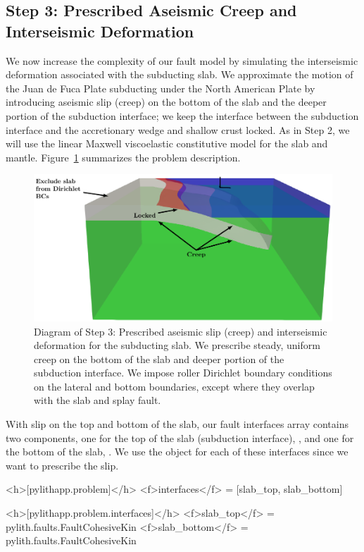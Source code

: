 \subsection{Step 3: Prescribed Aseismic Creep and Interseismic Deformation}
\label{sec:example:subduction:3d:step03}

We now increase the complexity of our fault model by simulating the
interseismic deformation associated with the subducting slab. We
approximate the motion of the Juan de Fuca Plate subducting under the
North American Plate by introducing aseismic slip (creep) on the
bottom of the slab and the deeper portion of the subduction interface;
we keep the interface between the subduction interface and the
accretionary wedge and shallow crust locked. As in Step 2, we will use
the linear Maxwell viscoelastic constitutive model for the slab and
mantle.  Figure~\ref{fig:example:subduction:3d:step03:diagram}
summarizes the problem description.

\begin{figure}[htbp]
  \includegraphics[scale=0.75]{examples/figs/subduction3d_step03_diagram}
  \caption{Diagram of Step 3: Prescribed aseismic slip (creep) and
    interseismic deformation for the subducting slab. We prescribe
    steady, uniform creep on the bottom of the slab and deeper portion
    of the subduction interface. We impose roller Dirichlet boundary
    conditions on the lateral and bottom boundaries, except where they
    overlap with the slab and splay fault.}
  \label{fig:example:subduction:3d:step03:diagram}
\end{figure}

With slip on the top and bottom of the slab, our fault interfaces
array contains two components, one for the top of the slab (subduction
interface), , and one for the bottom of the slab,
. We use the  object
for each of these interfaces since we want to prescribe the slip.
\begin{cfg}
<h>[pylithapp.problem]</h>
<f>interfaces</f> = [slab_top, slab_bottom]

<h>[pylithapp.problem.interfaces]</h>
<f>slab_top</f> = pylith.faults.FaultCohesiveKin
<f>slab_bottom</f> = pylith.faults.FaultCohesiveKin
\end{cfg}

